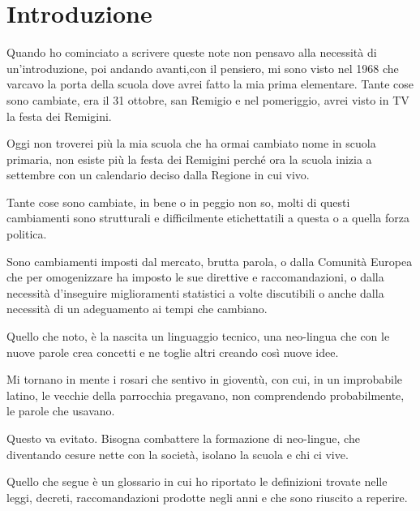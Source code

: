 \chapter{Introduzione}
Quando ho cominciato a scrivere queste note non pensavo alla necessità di un'introduzione, poi andando avanti,con il pensiero, mi sono visto nel 1968 che varcavo la porta della scuola dove avrei fatto la mia prima elementare. Tante cose sono cambiate, era il 31 ottobre, san Remigio e nel pomeriggio, avrei visto in TV la festa dei Remigini.\par  Oggi non troverei più la mia scuola che ha ormai cambiato nome in scuola primaria, non esiste più la festa dei Remigini perché ora la scuola inizia a settembre con un calendario deciso dalla Regione in cui vivo.\par  Tante cose sono cambiate, in bene o in peggio non so, molti di questi cambiamenti sono strutturali e difficilmente  etichettatili a questa o a quella forza politica.\par  Sono cambiamenti imposti dal mercato, brutta parola, o dalla Comunità Europea che per omogenizzare ha imposto le sue direttive e raccomandazioni, o dalla necessità d'inseguire  miglioramenti statistici a volte discutibili o anche dalla necessità di un adeguamento ai tempi che cambiano.\par  Quello che noto, è la nascita un linguaggio tecnico, una neo-lingua che con le nuove parole crea concetti e ne toglie altri creando così nuove idee.\par  Mi tornano in mente i rosari che sentivo in gioventù, con cui, in un improbabile latino, le vecchie della parrocchia pregavano, non comprendendo probabilmente, le parole che usavano.\par  Questo va evitato. Bisogna combattere la formazione di neo-lingue, che diventando  cesure nette con la società, isolano la scuola e  chi ci vive.\par  Quello che segue è un glossario in cui ho riportato le definizioni trovate nelle leggi, decreti, raccomandazioni prodotte negli anni e che sono riuscito a reperire. 